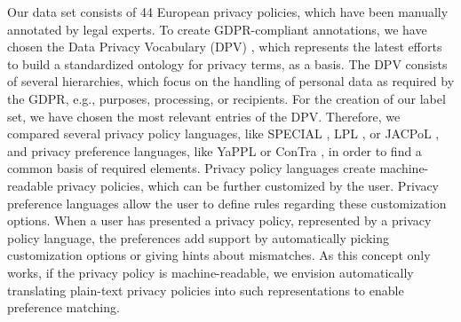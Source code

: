 \documentclass[a4paper,
               biblatex,     %
               hyphens,      %
               ]{jacow}
\begin{document}
Our data set consists of 44 European privacy policies, which have been manually annotated by legal experts. 
To create GDPR-compliant annotations, we have chosen the Data Privacy Vocabulary (DPV) \cite{dpvcg}, which represents the latest efforts to build a standardized ontology for privacy terms, as a basis.
The DPV consists of several hierarchies, which focus on the handling of personal data as required by the GDPR, e.g., purposes, processing, or recipients. 
For the creation of our label set, we have chosen the most relevant entries of the DPV. 
Therefore, we compared several privacy policy languages, like SPECIAL \cite{SPECIALmain}, LPL \cite{lplmain}, or JACPoL \cite{JACPoL}, and privacy preference languages, like YaPPL \cite{yappl} or ConTra \cite{contra}, in order to find a common basis of required elements. 
Privacy policy languages create machine-readable privacy policies, which can be further customized by the user. Privacy preference languages allow the user to define rules regarding these customization options. 
When a user has presented a privacy policy, represented by a privacy policy language, the preferences add support by automatically picking customization options or giving hints about mismatches. 
As this concept only works, if the privacy policy is machine-readable, we envision automatically translating plain-text privacy policies into such representations to enable preference matching.
\end{document}
